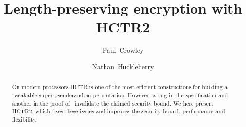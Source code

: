 \documentclass[letterpaper,11pt]{article}
\author{Paul~Crowley}
\author{Nathan~Huckleberry}
\affil{Google}
\title{Length-preserving encryption with HCTR2}
\begin{document}
\maketitle

\begin{abstract}
On modern processors HCTR\cite{hctr} is
one of the most efficient constructions
for building a tweakable super-pseudorandom permutation. However,
a bug in the specification and another in the proof of~\cite{hctrquad}
invalidate the claimed security bound. We here present HCTR2,
which fixes these issues and improves the
security bound, performance and flexibility.
\end{abstract}


\newpage

\newpage





\printbibliography[heading=bibintoc]
\appendix

\end{document}
